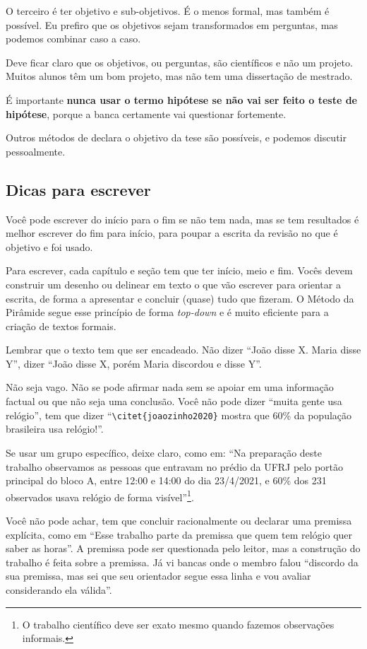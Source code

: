 \documentclass{article}
\begin{document}
\begin{itemize}
O terceiro é ter objetivo e sub-objetivos. É o menos formal, mas também é possível. Eu prefiro que os objetivos sejam transformados em perguntas, mas podemos combinar caso a caso.

Deve ficar claro que os objetivos, ou perguntas, são científicos e não um projeto. Muitos alunos têm um bom projeto, mas não tem uma dissertação de mestrado.

É importante \textbf{nunca usar o termo hipótese se não vai ser feito o teste de hipótese}, porque a banca certamente vai questionar fortemente.

Outros métodos de declara o objetivo da tese são possíveis, e podemos discutir pessoalmente.


\subsection{Dicas para escrever}
    
Você pode escrever do início para o fim se não tem nada, mas se tem resultados é melhor escrever do fim para início, para poupar a escrita da revisão no que é objetivo e foi usado.

Para escrever, cada capítulo e seção tem que ter início, meio e fim. Vocês devem construir um desenho ou delinear em texto o que vão escrever para orientar a escrita, de forma a apresentar e concluir (quase) tudo que fizeram. 
O Método da Pirâmide\citep{minto1,minto2} segue esse princípio de forma \textit{top-down} e é muito eficiente para a criação de textos formais.

Lembrar que o texto tem que ser encadeado. Não dizer ``João disse X. Maria disse Y'', dizer ``João disse X, porém Maria discordou e disse Y''.

Não seja vago. Não se pode afirmar nada sem se apoiar em uma informação factual ou que não seja uma conclusão. Você não pode dizer ``muita gente usa relógio'', tem que dizer ``\verb!\citet{joaozinho2020}! mostra que 60\% da população brasileira usa relógio!''.

Se usar um grupo específico, deixe claro, como em: ``Na preparação deste trabalho observamos as pessoas que entravam no prédio da UFRJ pelo portão principal do bloco A, entre 12:00 e 14:00 do dia 23/4/2021, e 60\% dos 231 observados usava relógio de forma visível''\footnote{O trabalho científico deve ser exato mesmo quando fazemos observações informais.}.

Você não pode achar, tem que concluir racionalmente ou declarar uma premissa explícita, como em ``Esse trabalho parte da premissa que quem tem relógio quer saber as horas''. A premissa pode ser questionada pelo leitor, mas a construção do trabalho é feita sobre a premissa. Já vi bancas onde o membro falou ``discordo da sua premissa, mas sei que seu orientador segue essa linha e vou avaliar considerando ela válida''.


\end{itemize}
\end{document}
